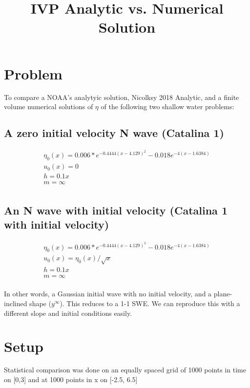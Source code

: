 \documentclass{article}
\title{ IVP Analytic vs. Numerical Solution }
\begin{document}
\maketitle

\section{Problem}

To compare a NOAA's analytyic solution, Nicolksy 2018 Analytic, and a finite volume numerical solutions of $\eta$ of the following two shallow water problems:

\subsection {A zero initial velocity N wave (Catalina 1)}

\[
\begin{aligned}
\eta_0(x) = 0.006*e^{-0.4444(x-4.129)^2} - 0.018e^{-4(x-1.6384)} \\
u_0(x) = 0 \\
h = 0.1x \\
m = \infty  \\
\end{aligned}
\]

\subsection{An N wave with initial velocity (Catalina 1 with initial velocity)}

\[
\begin{aligned}
\eta_0(x) = 0.006*e^{-0.4444(x-4.129)^2} - 0.018e^{-4(x-1.6384)} \\
u_0(x) = \eta_0(x)/\sqrt{x} \\
h = 0.1x \\
m = \infty  \\
\end{aligned}
\]

In other words, a Gaussian initial wave with no initial velocity, and a plane-inclined shape ($y^\infty$). This reduces to a 1-1 SWE. We can reproduce this with a different slope and initial conditions easily.

\section{Setup}

Statistical comparison was done on an equally spaced grid of 1000 points in time on [0,3] and at 1000 points in x on [-2.5, 6.5]
\end{document}
